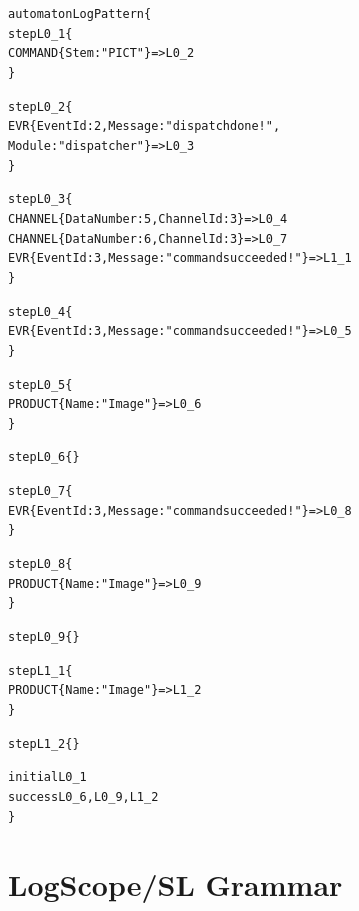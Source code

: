 \documentclass{report}
\newcommand{\logscopeSL}{{\sc LogScope/SL}}
\newenvironment{code}[1] %
{
\vspace{0.5cm}
\begin{center}
\begin{Sbox}
\begin{minipage}{11cm}
\begin{alltt}
{\bf\em #1}
}
{
\end{alltt}
\end{minipage}
\end{Sbox}
\setlength{\fboxsep}{8pt}
\fbox{\TheSbox}
\end{center}
\vspace{0.5cm}
}
\begin{document}
\begin{code}{}
automaton LogPattern \{
  step L0_1 \{
    COMMAND\{Stem : "PICT"\} => L0_2
  \}

  step L0_2 \{
    EVR\{EventId : 2,Message : "dispatch done!",
          Module : "dispatcher"\} => L0_3
  \}

  step L0_3 \{
    CHANNEL\{DataNumber : 5,ChannelId : 3\} => L0_4
    CHANNEL\{DataNumber : 6,ChannelId : 3\} => L0_7
    EVR\{EventId : 3,Message : "command succeeded!"\} => L1_1
  \}

  step L0_4 \{
    EVR\{EventId : 3,Message : "command succeeded!"\} => L0_5
  \}

  step L0_5 \{
    PRODUCT\{Name : "Image"\} => L0_6
  \}

  step L0_6 \{\}

  step L0_7 \{
    EVR\{EventId : 3,Message : "command succeeded!"\} => L0_8
  \}

  step L0_8 \{
    PRODUCT\{Name : "Image"\} => L0_9
  \}

  step L0_9 \{\}

  step L1_1 \{
    PRODUCT\{Name : "Image"\} => L1_2
  \}

  step L1_2 \{\}

  initial L0_1
  success L0_6,L0_9,L1_2
\}
\end{code}


\appendix

\chapter{\logscopeSL{} Grammar}
\label{app:grammar}
\end{document}
